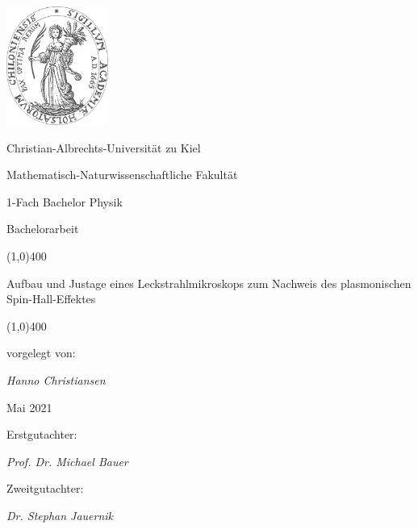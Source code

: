 \documentclass[12pt,a4paper]{report}
\begin{document}
	\begin{titlepage}
		\centering
		\includegraphics[width=0.25\textwidth]{figures/Siegel_der_CAU.pdf}\par\vspace{0.5cm}
		{\large Christian-Albrechts-Universität zu Kiel \par
			Mathematisch-Naturwissenschaftliche Fakultät \par
			1-Fach Bachelor Physik \par
		}
		\vspace{1cm}
		{\large Bachelorarbeit\par}
		\vspace{1cm}
		\line(1,0){400} \par
		{\huge Aufbau und Justage eines Leckstrahlmikroskops zum Nachweis des plasmonischen Spin-Hall-Effektes\par}
		\line(1,0){400}\par
		\vspace{1.5cm}
		vorgelegt von:\par
		\vspace{1mm}
		{\large\itshape Hanno Christiansen\par}
		\vspace{0.5cm}
		{\large Mai 2021\par}
		\vfill

		Erstgutachter:\par
		\vspace{1mm}
		{\large\itshape Prof. Dr. Michael Bauer}
		
		\vspace{0.5cm}

		Zweitgutachter:\par
		\vspace{1mm}
		{\large\itshape Dr. Stephan Jauernik}		
		\vfill
		
		
	\end{titlepage}
\end{document}
